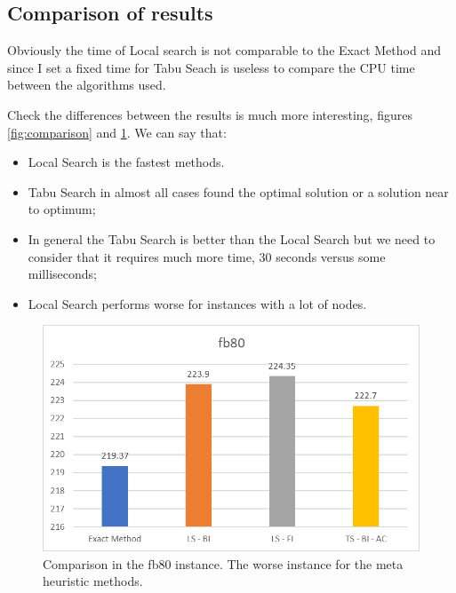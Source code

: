 
\subsection{Comparison of results}

	Obviously the time of Local search is not comparable to the Exact Method and since I set a fixed time for Tabu Seach is useless to compare the CPU time between the algorithms used.
	
	Check the differences between the results is much more interesting, figures \ref{fig:comparison} and \ref{fig:fb80-comparison}. We can say that:
	\begin{itemize}
		\item Local Search is the fastest methods.
		\item Tabu Search in almost all cases found the optimal solution or a solution near to optimum;
		\item In general the Tabu Search is better than the Local Search but we need to consider that it requires much more time, 30 seconds versus some milliseconds;
		\item Local Search performs worse for instances with a lot of nodes.
	\end{itemize}

	\vspace{2cm}
	
	\begin{figure}[bh]
		\centering
		\includegraphics[width=\linewidth]{img/fb80-comparison}
		\caption{Comparison in the fb80 instance. The worse instance for the meta heuristic methods.}
		\label{fig:fb80-comparison}
	\end{figure}
	
